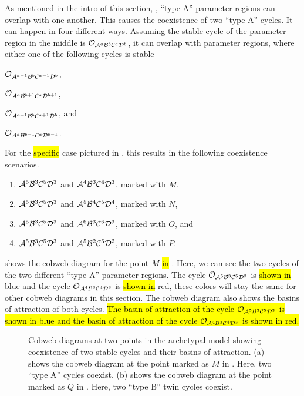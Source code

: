 As mentioned in the intro of this section, , ``type A'' parameter regions can overlap with one another.
This causes the coexistence of two ``type A'' cycles.
It can happen in four different ways.
Assuming the stable cycle of the parameter region in the middle is $\mathcal{O}_{\mathcal{A}^a\mathcal{B}^b\mathcal{C}^a\mathcal{D}^b}$, it can overlap with parameter regions, where either one of the following cycles is stable
\begin{enumerate*}
	\item $\mathcal{O}_{\mathcal{A}^{a-1}\mathcal{B}^b\mathcal{C}^{a-1}\mathcal{D}^b}$,
	\item $\mathcal{O}_{\mathcal{A}^a\mathcal{B}^{b+1}\mathcal{C}^a\mathcal{D}^{b+1}}$,
	\item $\mathcal{O}_{\mathcal{A}^{a+1}\mathcal{B}^b\mathcal{C}^{a+1}\mathcal{D}^b}$, and
	\item $\mathcal{O}_{\mathcal{A}^a\mathcal{B}^{b-1}\mathcal{C}^a\mathcal{D}^{b-1}}$.
\end{enumerate*}
For the \hl{specific} case pictured in , this results in the following coexistence scenarios.
\begin{enumerate}
	\item $\mathcal{A}^5\mathcal{B}^3\mathcal{C}^5\mathcal{D}^3$ and $\mathcal{A}^4\mathcal{B}^3\mathcal{C}^4\mathcal{D}^3$, marked with $M$,
	\item $\mathcal{A}^5\mathcal{B}^3\mathcal{C}^5\mathcal{D}^3$ and $\mathcal{A}^5\mathcal{B}^4\mathcal{C}^5\mathcal{D}^4$, marked with $N$,
	\item $\mathcal{A}^5\mathcal{B}^3\mathcal{C}^5\mathcal{D}^3$ and $\mathcal{A}^6\mathcal{B}^3\mathcal{C}^6\mathcal{D}^3$, marked with $O$, and
	\item $\mathcal{A}^5\mathcal{B}^3\mathcal{C}^5\mathcal{D}^3$ and $\mathcal{A}^5\mathcal{B}^2\mathcal{C}^5\mathcal{D}^2$, marked with $P$.
\end{enumerate}
 shows the cobweb diagram for the point $M$ \hl{in} .
Here, we can see the two cycles of the two different ``type A'' parameter regions.
The cycle $\mathcal{O}_{\mathcal{A}^5\mathcal{B}^3\mathcal{C}^5\mathcal{D}^3}$ is \hl{shown in} blue and the cycle $\mathcal{O}_{\mathcal{A}^4\mathcal{B}^3\mathcal{C}^4\mathcal{D}^3}$ is \hl{shown in} red, these colors will stay the same for other cobweb diagrams in this section.
The cobweb diagram also shows the basins of attraction of both cycles.
\hl{
	The basin of attraction of the cycle $\mathcal{O}_{\mathcal{A}^5\mathcal{B}^3\mathcal{C}^5\mathcal{D}^3}$ is shown in blue and the basin of attraction of the cycle $\mathcal{O}_{\mathcal{A}^4\mathcal{B}^3\mathcal{C}^4\mathcal{D}^3}$ is shown in red.
}

\begin{figure}
	\centering
	\caption[Cobweb diagrams of the archetypal model showing coexistence of two cycles]{
		Cobweb diagrams at two points in the archetypal model showing coexistence of two stable cycles and their basins of attraction.
		(a) shows the cobweb diagram at the point marked as $M$ in .
		Here, two ``type A'' cycles coexist.
		(b) shows the cobweb diagram at the point marked as $Q$ in .
		Here, two ``type B'' twin cycles coexist.
	}
\end{figure}

